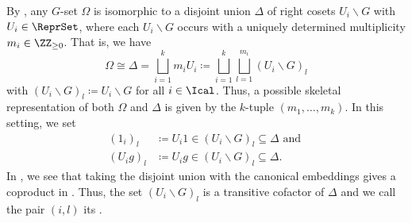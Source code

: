 \begin{rem}
By , any $G$-set $\Omega$ is isomorphic to a disjoint union $\Delta$ of right cosets $U_i \backslash G$ with $U_i \in \ReprSet$, where each $U_i \backslash G$ occurs with a uniquely determined multiplicity $m_i \in \ZZ_{\geq 0}$. That is, we have \[\Omega \cong \Delta = \bigsqcup_{i=1}^k m_i U_i \coloneqq \bigsqcup_{i=1}^k \bigsqcup_{l=1}^{m_i} (U_i \backslash G)_l\] with $(U_i \backslash G)_l \coloneqq U_i \backslash G$ for all $i \in \Ical$. Thus, a possible skeletal representation of both $\Omega$ and $\Delta$ is given by the $k$-tuple $(m_1,\dots,m_k)$. In this setting, we set
\begin{align*}
(1_i)_l &\coloneqq U_i1 \in (U_i \backslash G)_l \subseteq \Delta\text{ and }\\
(U_ig)_l &\coloneqq U_ig \in (U_i \backslash G)_l \subseteq \Delta.
\end{align*}
In \cite{Julia}, we see that taking the disjoint union with the canonical embeddings gives a coproduct in \Gset{}. Thus, the set $(U_i \backslash G)_l$ is a transitive cofactor of $\Delta$ and we call the pair $(i,l)$ its .
\end{rem}


